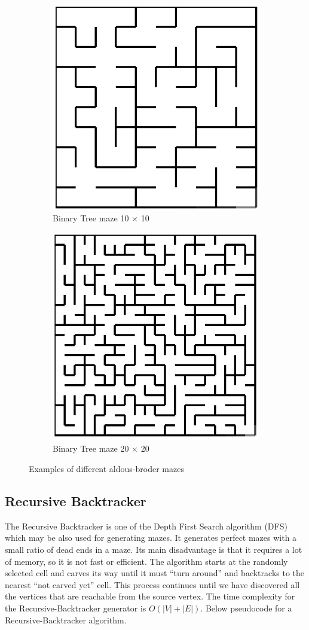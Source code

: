 \newline
\begin{figure}[!h]
	\centering
	\begin{subfigure}{.45\textwidth}
	  \centering
	  \includegraphics[width=.6\linewidth]{aldous1010}
	  \caption{Binary Tree maze 10 $\times$ 10}
	  \label{fig:sub1}
	\end{subfigure}
	\begin{subfigure}{.45\textwidth}
	  \centering
	  \includegraphics[width=.6\linewidth]{aldous2020}
	  \caption{Binary Tree maze 20 $\times$ 20}
	  \label{fig:sub2}
	\end{subfigure}
	\caption{Examples of different aldous-broder mazes}
	\label{fig:test}
	\end{figure}

\subsection{Recursive Backtracker}

The Recursive Backtracker is one of the Depth First Search algorithm (DFS) which may be also used for generating mazes. It generates perfect mazes with a small ratio of dead ends in a maze. Its main disadvantage is that it requires a lot of memory, so it is not fast or efficient. The algorithm starts at the randomly selected cell and carves its way until it must “turn around” and backtracks to the nearest “not carved yet” cell. This process continues until we have discovered all the vertices that are reachable from the source vertex. The time complexity for the Recursive-Backtracker generator is $O(|V|+|E|)$. Below pseudocode for a Recursive-Backtracker algorithm.

